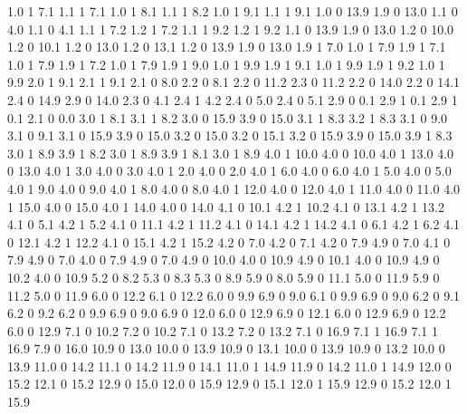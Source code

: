 1.0	1	7.1	1.1	1	7.1
1.0	1	8.1	1.1	1	8.2
1.0 	1 	9.1  	1.1 	1 	9.1
1.0	0	13.9	1.9	0	13.0
1.1 	0 	4.0  	1.1 	0 	4.1
1.1 	1 	7.2  	1.2 	1 	7.2
1.1	1	9.2	1.2	1	9.2
1.1	0	13.9	1.9	0	13.0
1.2	0	10.0	1.2	0	10.1
1.2	0	13.0	1.2	0	13.1
1.2	0	13.9	1.9	0	13.0
1.9	1	7.0	1.0	1	7.9
1.9	1	7.1	1.0	1	7.9
1.9	1	7.2	1.0	1	7.9
1.9	1	9.0	1.0	1	9.9
1.9	1	9.1	1.0	1	9.9
1.9	1	9.2	1.0	1	9.9
2.0	1	9.1	2.1	1	9.1
2.1	0 	8.0	2.2	0	8.1
2.2	0	11.2	2.3	0	11.2
2.2	0	14.0	2.2	0	14.1
2.4	0	14.9	2.9	0	14.0
2.3 	0	4.1	2.4	1	4.2
2.4	0	5.0	2.4	0	5.1
2.9	0	0.1	2.9	1	0.1
2.9	1	0.1	2.1	0	0.0
3.0	1	8.1	3.1	1	8.2
3.0	0	15.9	3.9	0	15.0
3.1	1	8.3	3.2	1	8.3
3.1	0	9.0	3.1	0	9.1
3.1	0	15.9	3.9	0	15.0
3.2	0	15.0	3.2	0	15.1
3.2	0	15.9	3.9	0	15.0
3.9	1	8.3	3.0	1	8.9
3.9	1	8.2	3.0	1	8.9
3.9	1	8.1	3.0	1	8.9
4.0	1	10.0	4.0	0	10.0
4.0	1	13.0	4.0	0	13.0
4.0	1	3.0	4.0	0	3.0
4.0	1	2.0	4.0	0	2.0
4.0	1	6.0	4.0	0	6.0
4.0	1	5.0	4.0	0	5.0
4.0	1	9.0	4.0	0	9.0
4.0	1	8.0	4.0	0	8.0
4.0	1	12.0	4.0	0	12.0
4.0	1	11.0	4.0	0	11.0
4.0	1	15.0	4.0	0	15.0
4.0	1	14.0	4.0	0	14.0
4.1	0	10.1	4.2	1	10.2
4.1	0	13.1	4.2	1	13.2
4.1	0	5.1	4.2	1	5.2
4.1	0	11.1	4.2	1	11.2
4.1	0	14.1	4.2	1	14.2
4.1	0	6.1	4.2	1	6.2
4.1	0	12.1	4.2	1	12.2
4.1	0	15.1	4.2	1	15.2
4.2	0	7.0	4.2	0	7.1
4.2	0	7.9	4.9	0	7.0
4.1	0	7.9	4.9	0	7.0
4.0	0	7.9	4.9	0	7.0
4.9	0	10.0	4.0	0	10.9
4.9	0	10.1	4.0	0	10.9
4.9	0	10.2	4.0	0	10.9
5.2	0	8.2	5.3	0	8.3
5.3	0	8.9	5.9	0	8.0
5.9	0	11.1	5.0	0	11.9
5.9	0	11.2	5.0	0	11.9
6.0	0	12.2	6.1	0	12.2
6.0	0	9.9	6.9	0	9.0
6.1	0	9.9	6.9	0	9.0
6.2	0	9.1	6.2	0	9.2
6.2	0	9.9	6.9	0	9.0
6.9	0	12.0	6.0	0	12.9
6.9	0	12.1	6.0	0	12.9
6.9	0	12.2	6.0	0	12.9
7.1	0	10.2	7.2	0	10.2
7.1	0	13.2	7.2	0	13.2
7.1	0	16.9	7.1	1	16.9
7.1	1	16.9	7.9	0	16.0
10.9	0	13.0	10.0	0	13.9
10.9	0	13.1	10.0	0	13.9
10.9	0	13.2	10.0	0	13.9
11.0	0	14.2	11.1	0	14.2
11.9	0	14.1	11.0	1	14.9
11.9	0	14.2	11.0	1	14.9
12.0	0	15.2	12.1	0	15.2
12.9	0	15.0	12.0	0	15.9
12.9	0	15.1	12.0	1	15.9
12.9	0	15.2	12.0	1	15.9